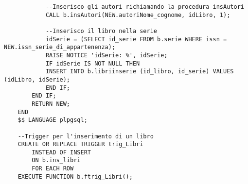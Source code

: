 \begin{lstlisting}
            --Inserisco gli autori richiamando la procedura insAutori
            CALL b.insAutori(NEW.autoriNome_cognome, idLibro, 1);
    
            --Inserisco il libro nella serie
            idSerie = (SELECT id_serie FROM b.serie WHERE issn = NEW.issn_serie_di_appartenenza);
            RAISE NOTICE 'idSerie: %', idSerie;
            IF idSerie IS NOT NULL THEN
            INSERT INTO b.libriinserie (id_libro, id_serie) VALUES (idLibro, idSerie);
            END IF;
        END IF;
        RETURN NEW;
    END
    $$ LANGUAGE plpgsql;
    
    --Trigger per l'inserimento di un libro
    CREATE OR REPLACE TRIGGER trig_Libri
        INSTEAD OF INSERT
        ON b.ins_libri
        FOR EACH ROW
    EXECUTE FUNCTION b.ftrig_Libri();
\end{lstlisting}

